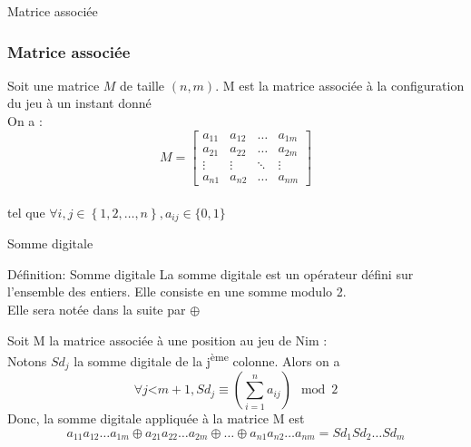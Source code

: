 \documentclass[ aspectratio=169]{beamer}
\begin{document}
		\begin{frame}{Matrice associée}
		\subsubsection{Matrice associée}
		Soit une matrice $M$ de taille $(n,m)$. M est la matrice associée à la configuration du jeu à un instant donné\\
		On a : \\
		\begin{equation}
		 M =
		\begin{bmatrix}
		a_{11}&a_{12} & \dots & a_{1m}\\
		a_{21}&a_{22} & \dots & a_{2m}\\
		\vdots & \vdots & \ddots & \vdots \\
		a_{n1}& a_{n2} & \dots & a_{nm}
		\end{bmatrix}
		\end{equation}\\
		tel que $\forall i,j \in \left\lbrace 1,2,\dots ,n\right\rbrace , a_{ij} \in \{ 0 , 1\} $
		\end{frame}
		
		\begin{frame}{Somme digitale}
			\begin{block}{Définition: Somme digitale}
	La somme digitale est un opérateur défini sur l'ensemble des entiers. Elle consiste en une somme modulo 2.\\
	Elle sera notée dans la suite par $\oplus$
			\end{block}
		\end{frame}
		
		\begin{frame}
		Soit M la matrice associée à une position au jeu de Nim :\\
		Notons $Sd_{j}$ la somme digitale de la j\textsuperscript{ème} colonne. Alors on a 
		\begin{equation*}
		\forall j \text{<} m+1, Sd_{j} \equiv \left(\sum_{i=1}^n a_{ij}\right) \mod 2
		\end{equation*}
		Donc, la somme digitale appliquée à la matrice M est 
		$$
		a_{11}a_{12}\dots a_{1m} \oplus a_{21}a_{22}\dots a_{2m} \oplus \dots \oplus a_{n1}a_{n2}\dots a_{nm} = Sd_{1}Sd_{2}\dots Sd_{m}
		$$
		\end{frame}
		
\end{document}
